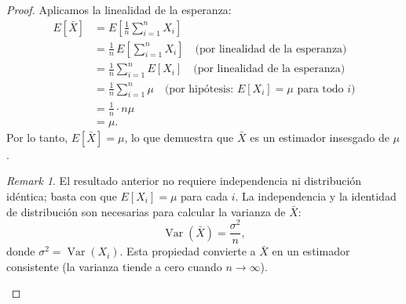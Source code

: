 \documentclass[11pt,a4paper]{article}
\theoremstyle{plain}
\theoremstyle{definition}
\theoremstyle{remark}
\newtheorem{remark}[theorem]{Remark}
\begin{document}
\begin{proof}
Aplicamos la linealidad de la esperanza:
\begin{align*}
E[\bar{X}] &= E\!\left[\frac{1}{n}\sum_{i=1}^n X_i\right] \\
&= \frac{1}{n}\,E\!\left[\sum_{i=1}^n X_i\right] \quad \text{(por linealidad de la esperanza)} \\
&= \frac{1}{n}\sum_{i=1}^n E[X_i] \quad \text{(por linealidad de la esperanza)} \\
&= \frac{1}{n}\sum_{i=1}^n \mu \quad \text{(por hipótesis: } E[X_i] = \mu \text{ para todo } i\text{)} \\
&= \frac{1}{n} \cdot n\mu \\
&= \mu.
\end{align*}
Por lo tanto, $E[\bar{X}] = \mu$, lo que demuestra que $\bar{X}$ es un estimador insesgado de $\mu$.

\begin{remark}
El resultado anterior no requiere independencia ni distribución idéntica; basta con que $E[X_i] = \mu$ para cada $i$. La independencia y la identidad de distribución son necesarias para calcular la varianza de $\bar{X}$:
\[
\operatorname{Var}(\bar{X}) = \frac{\sigma^2}{n},
\]
donde $\sigma^2 = \operatorname{Var}(X_i)$. Esta propiedad convierte a $\bar{X}$ en un estimador consistente (la varianza tiende a cero cuando $n \to \infty$).
\end{remark}
\end{proof}
\end{document}
